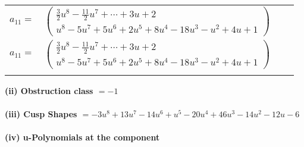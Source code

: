 \documentclass[1p]{elsarticle_modified}
\theoremstyle{definition}
\begin{document}
\begin{tabular}{m{7pt} m{180pt} m{7pt} m{180pt} }
\flushright $a_{11}=$&$\begin{pmatrix}\frac{3}{2} u^8-\frac{11}{2} u^7+\cdots+3 u+2\\u^8-5 u^7+5 u^6+2 u^5+8 u^4-18 u^3- u^2+4 u+1\end{pmatrix}$\\ \flushright $a_{11}=$&$\begin{pmatrix}\frac{3}{2} u^8-\frac{11}{2} u^7+\cdots+3 u+2\\u^8-5 u^7+5 u^6+2 u^5+8 u^4-18 u^3- u^2+4 u+1\end{pmatrix}$\\&\end{tabular}
\flushleft \textbf{(ii) Obstruction class $= -1$}\\~\\
\flushleft \textbf{(iii) Cusp Shapes $= -3 u^8+13 u^7-14 u^6+u^5-20 u^4+46 u^3-14 u^2-12 u-6$}\\~\\
\newpage\renewcommand{\arraystretch}{1}
\flushleft \textbf{(iv) u-Polynomials at the component}\newline \\
\end{document}
